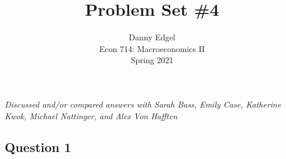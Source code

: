 \documentclass{article}
\begin{document}
\title{	Problem Set \#4 }
\author{ 	Danny Edgel 					\\ 
			Econ 714: Macroeconomics II		\\
			Spring 2021						\\
		}
\maketitle\thispagestyle{empty}


\noindent\textit{Discussed and/or compared answers with Sarah Bass, Emily Case, Katherine Kwok, Michael Nattinger, and Alex Von Hafften}


\subsection*{Question 1}
\end{document}
